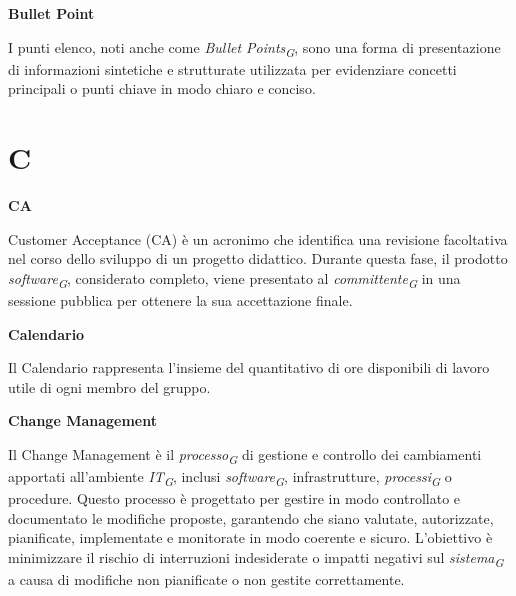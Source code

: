 \documentclass{article}
\begin{document}
\textbf{Bullet Point}

\vspace{0.1cm}

I punti elenco, noti anche come \textit{Bullet Points}\textsubscript{\textit{G}}, sono una forma di presentazione di informazioni sintetiche e strutturate utilizzata per evidenziare concetti principali o punti chiave in modo chiaro e conciso.

\pagebreak
\section*{C}
{}

\vspace{0.4cm}

\textbf{CA}

\vspace{0.1cm}

Customer Acceptance (CA) è un acronimo che identifica una revisione facoltativa nel corso dello sviluppo di un progetto didattico. Durante questa fase, il prodotto \textit{software}\textsubscript{\textit{G}}, considerato completo, viene presentato al \textit{committente}\textsubscript{\textit{G}} in una sessione pubblica per ottenere la sua accettazione finale.

\vspace{0.4cm}

\textbf{Calendario}

\vspace{0.1cm}

Il Calendario rappresenta l’insieme del quantitativo di ore disponibili di lavoro utile di ogni membro del gruppo.

\vspace{0.4cm}

\textbf{Change Management}

\vspace{0.1cm}

Il Change Management è il \textit{processo}\textsubscript{\textit{G}} di gestione e controllo dei cambiamenti apportati all'ambiente \textit{IT}\textsubscript{\textit{G}}, inclusi \textit{software}\textsubscript{\textit{G}}, infrastrutture, \textit{processi}\textsubscript{\textit{G}} o procedure. Questo processo è progettato per gestire in modo controllato e documentato le modifiche proposte, garantendo che siano valutate, autorizzate, pianificate, implementate e monitorate in modo coerente e sicuro. L'obiettivo è minimizzare il rischio di interruzioni indesiderate o impatti negativi sul \textit{sistema}\textsubscript{\textit{G}} a causa di modifiche non pianificate o non gestite correttamente.
\end{document}
